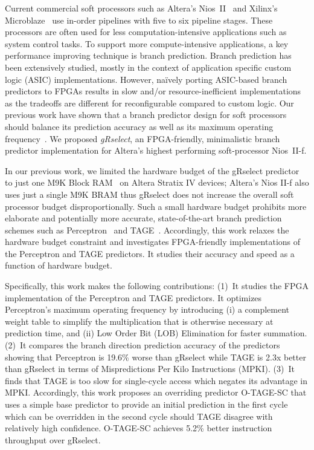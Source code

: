 \documentclass[conference]{IEEEtran}
\begin{document}
Current commercial soft processors such as Altera's Nios~II~\cite{niosii} and Xilinx's Microblaze~\cite{microblaze} use in-order pipelines with five to six pipeline stages. These processors are often used for less computation-intensive applications such as system control tasks. To support more compute-intensive applications, a key performance improving technique is branch prediction. Branch prediction has been extensively studied, mostly in the context of application specific custom logic (ASIC) implementations. However, na\"ively porting ASIC-based branch predictors to FPGAs results in slow and/or resource-inefficient implementations as the tradeoffs are different for reconfigurable compared to custom logic. Our previous work have shown that a branch predictor design for soft processors should balance its prediction accuracy as well as its maximum operating frequency~\cite{grselect}. We proposed \textit{gRselect}, an FPGA-friendly, minimalistic branch predictor implementation for Altera's highest performing soft-processor Nios~II-f. 

In our previous work, we limited the hardware budget of the gRselect predictor to just one M9K Block RAM~\cite{StratixIVM9K} on Altera Stratix IV devices; Altera's Nios II-f also uses just a single M9K BRAM thus gRselect does not increase the overall soft processor budget disproportionally. Such a small hardware budget prohibits more elaborate and potentially more accurate, state-of-the-art branch prediction schemes such as Perceptron~\cite{perceptron} and TAGE~\cite{tage}. Accordingly, this work relaxes the hardware budget constraint and investigates FPGA-friendly implementations of the Perceptron and TAGE predictors. It studies their accuracy and speed as a function of hardware budget.

Specifically, this work makes the following contributions: (1)~It studies the FPGA implementation of the Perceptron and TAGE predictors. It optimizes Perceptron's maximum operating frequency by introducing (i) a complement weight table to simplify the multiplication that is otherwise necessary at  prediction time, and (ii) Low Order Bit (LOB) Elimination for faster summation. (2)~It compares the branch direction prediction accuracy of the predictors showing that Perceptron is 19.6\% worse than gRselect while TAGE is 2.3x better than gRselect in terms of Mispredictions Per Kilo Instructions (MPKI). (3)~It finds that TAGE is too slow for single-cycle access which negates its advantage in MPKI. Accordingly, this work proposes an overriding predictor \mbox{O-TAGE-SC} that uses a simple base predictor to provide an initial prediction in the first cycle which can be overridden in the second cycle should TAGE disagree with relatively high confidence. \mbox{O-TAGE-SC} achieves 5.2\% better instruction throughput over gRselect. 
\end{document}
